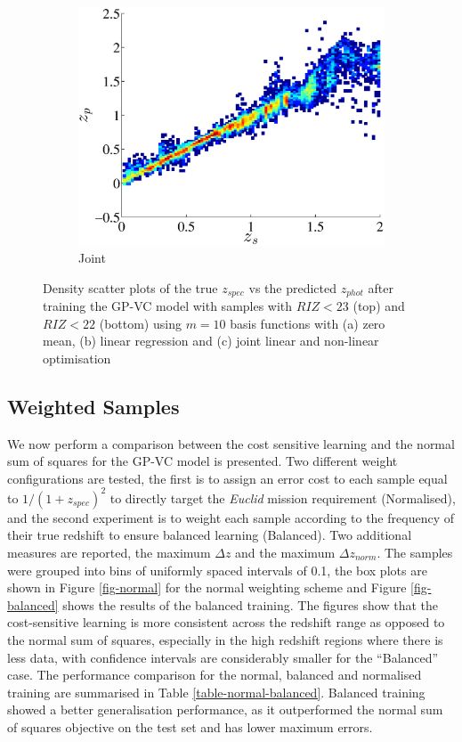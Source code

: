 \documentclass[useAMS,usenatbib,fleqn]{mn2e}
\begin{document}
\begin{figure}
\begin{subfigure}[b]{0.3\textwidth}
                \includegraphics[width=\textwidth]{figures/22_J.eps}
                \caption{Joint}
        \end{subfigure}
        
        \caption{Density scatter plots of the true $z_{spec}$ vs the predicted $z_{phot}$ after training the GP-VC model with samples with $RIZ<23$ (top) and $RIZ<22$ (bottom) using $m=10$ basis functions with (a) zero mean, (b) linear regression and (c) joint linear and non-linear optimisation}
        \label{fig-RIZ-splits}
\end{figure}


\subsection{Weighted Samples}
We now perform a comparison between the cost sensitive learning and the normal sum of squares for the GP-VC model is presented. Two different weight configurations are tested, the first is to assign an error cost to each sample equal to $1/\left(1+z_{spec}\right)^{2}$ to directly target the {\em Euclid} mission requirement (Normalised), and the second experiment is to weight each sample according to the frequency of their true redshift to ensure balanced learning (Balanced).  Two additional measures are reported, the maximum $\Delta z$ and the maximum $\Delta z_{norm}$. The samples were grouped into bins of uniformly spaced intervals of 0.1, the box plots are shown in Figure \ref{fig-normal} for the normal weighting scheme and Figure \ref{fig-balanced} shows the results of the balanced training. The figures show that the cost-sensitive learning is more consistent across the redshift range as opposed to the normal sum of squares, especially in the high redshift regions where there is less data, with confidence intervals are considerably smaller for the ``Balanced'' case. The performance comparison for the normal, balanced and normalised training are summarised in Table \ref{table-normal-balanced}. Balanced training showed a better generalisation performance, as it outperformed the normal sum of squares objective on the test set and has lower maximum errors.
\end{document}
